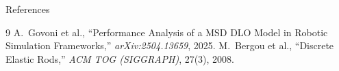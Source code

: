 \documentclass[aspectratio=169]{beamer}
\begin{document}
\begin{frame}[noframenumbering]{References}
\small
\begin{thebibliography}{9}
 A.~Govoni et al.,
``Performance Analysis of a MSD DLO Model in Robotic Simulation Frameworks,''
\textit{arXiv:2504.13659}, 2025.
 M.~Bergou et al.,
``Discrete Elastic Rods,'' \textit{ACM TOG (SIGGRAPH)}, 27(3), 2008.
\end{thebibliography}
\end{frame}
\end{document}
